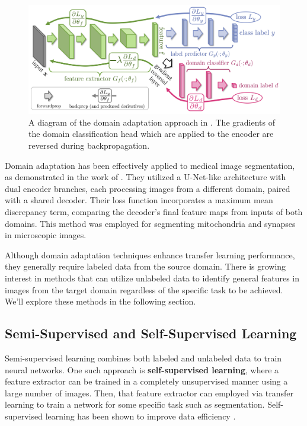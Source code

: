 \begin{figure}[h!]
 \centering
 \includegraphics[width=0.7\linewidth]{images/3/unsup-dom-adpt}
 \caption{A diagram of the domain adaptation approach in \citet{ganinDA2015}. The gradients of the domain classification head which are applied to the encoder are reversed during backpropagation.}
 \label{fig:unsup-dom-adpt}
\end{figure}
	
Domain adaptation has been effectively applied to medical image segmentation, as demonstrated in the work of \citet{bermudez-chaconDomainadaptiveTwostreamUNet2018}. They utilized a U-Net-like architecture with dual encoder branches, each processing images from a different domain, paired with a shared decoder. Their loss function incorporates a maximum mean discrepancy term, comparing the decoder’s final feature maps from inputs of both domains. This method was employed for segmenting mitochondria and synapses in microscopic images.

Although domain adaptation techniques enhance transfer learning performance, they generally require labeled data from the source domain. There is growing interest in methods that can utilize unlabeled data to identify general features in images from the target domain regardless of the specific task to be achieved. We'll explore these methods in the following section.

	\subsection{Semi-Supervised and Self-Supervised Learning}
	
Semi-supervised learning combines both labeled and unlabeled data to train neural networks. One such approach is \textbf{self-supervised learning}, where a feature extractor can be trained in a completely unsupervised manner using a large number of images. Then, that feature extractor can employed via transfer learning to train a network for some specific task such as segmentation. Self-supervised learning has
been shown to improve data efficiency
\cite{chenSimpleFrameworkContrastive2020}. 


